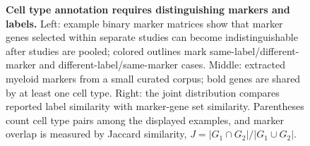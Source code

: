 \begin{figure}[t]
\centering
\resizebox{\textwidth}{!}{%
}
\caption{\textbf{Cell type annotation requires distinguishing markers and labels.} Left: example binary marker matrices show that marker genes selected within separate studies can become indistinguishable after studies are pooled; colored outlines mark same-label/different-marker and different-label/same-marker cases. Middle: extracted myeloid markers  from a small curated corpus; bold genes are shared by at least one cell type. Right: the joint distribution compares reported label similarity with marker-gene set similarity. Parentheses count cell type pairs among the displayed examples, and marker overlap is measured by Jaccard similarity, $J=|G_1\cap G_2|/|G_1\cup G_2|$.}
\label{fig:paper_celltype_joint}
%
\end{figure}
